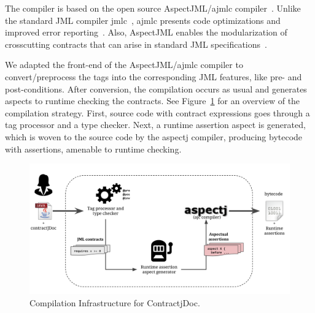 The \contractjdoc{} compiler is based on the open source AspectJML/ajmlc compiler~\cite{aspectjml,ajmlc,Rebelo-etal08}.
Unlike the standard JML compiler jmlc~\cite{jmlc-compiler}, ajmlc presents code optimizations and improved error reporting~\cite{ajmlc}.
Also, AspectJML enables the modularization
of crosscutting contracts that can arise in standard
JML specifications~\cite{aspectjml}.

We adapted the front-end of the AspectJML/ajmlc compiler to convert/preprocess the \contractjdoc{} tags into the corresponding JML features, like pre- and post-conditions.
After conversion, the compilation occurs as usual and generates aspects to runtime checking the
contracts. See Figure~\ref{fig:compilerInfra}
for an overview of the compilation strategy.
First, source code with \contractjdoc{}
contract expressions goes through a tag processor and a type checker. Next, a runtime assertion aspect is generated, which is woven to the source code by the aspectj compiler, producing bytecode with assertions, amenable to runtime checking.


\begin{figure}[h]
\centering
\includegraphics[width=1.0\textwidth]{figs/compilerInfra}
\caption{Compilation Infrastructure for ContractjDoc.}
\label{fig:compilerInfra}
\end{figure}

